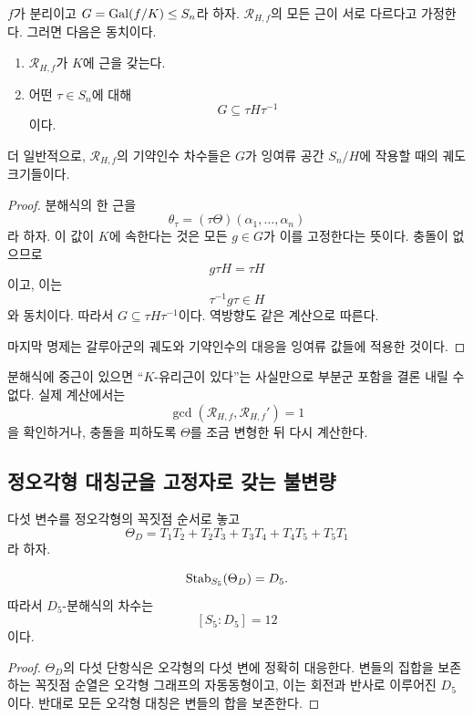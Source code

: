 \begin{theorem}[부분군 포함 판정]
\label{thm:subgroup-resolvent-criterion}
$f$가 분리이고 $G=\operatorname{Gal}(f/K)\le S_n$라 하자. $\mathcal R_{H,f}$의 모든 근이 서로 다르다고 가정한다. 그러면 다음은 동치이다.
\begin{enumerate}[label=(\roman*)]
  \item $\mathcal R_{H,f}$가 $K$에 근을 갖는다.
  \item 어떤 $\tau\in S_n$에 대해
  \[
    G\subseteq\tau H\tau^{-1}
  \]
  이다.
\end{enumerate}
더 일반적으로, $\mathcal R_{H,f}$의 기약인수 차수들은 $G$가 잉여류 공간 $S_n/H$에 작용할 때의 궤도 크기들이다.
\end{theorem}

\begin{proof}
분해식의 한 근을
\[
  \theta_\tau=(\tau\Theta)(\alpha_1,\dots,\alpha_n)
\]
라 하자. 이 값이 $K$에 속한다는 것은 모든 $g\in G$가 이를 고정한다는 뜻이다. 충돌이 없으므로
\[
  g\tau H=\tau H
\]
이고, 이는
\[
  \tau^{-1}g\tau\in H
\]
와 동치이다. 따라서 $G\subseteq\tau H\tau^{-1}$이다. 역방향도 같은 계산으로 따른다.

마지막 명제는 갈루아군의 궤도와 기약인수의 대응을 잉여류 값들에 적용한 것이다.
\end{proof}

\begin{pitfall}
분해식에 중근이 있으면 ``$K$-유리근이 있다''는 사실만으로 부분군 포함을 결론 내릴 수 없다. 실제 계산에서는
\[
  \gcd(\mathcal R_{H,f},\mathcal R_{H,f}')=1
\]
을 확인하거나, 충돌을 피하도록 $\Theta$를 조금 변형한 뒤 다시 계산한다.
\end{pitfall}

\subsection{정오각형 대칭군을 고정자로 갖는 불변량}

다섯 변수를 정오각형의 꼭짓점 순서로 놓고
\[
  \Theta_D
  =T_1T_2+T_2T_3+T_3T_4+T_4T_5+T_5T_1
\]
라 하자.

\begin{proposition}
\label{prop:d5-invariant-stabilizer}
\[
  \operatorname{Stab}_{S_5}(\Theta_D)=D_5.
\]
따라서 $D_5$-분해식의 차수는
\[
  [S_5:D_5]=12
\]
이다.
\end{proposition}

\begin{proof}
$\Theta_D$의 다섯 단항식은 오각형의 다섯 변에 정확히 대응한다. 변들의 집합을 보존하는 꼭짓점 순열은 오각형 그래프의 자동동형이고, 이는 회전과 반사로 이루어진 $D_5$이다. 반대로 모든 오각형 대칭은 변들의 합을 보존한다.
\end{proof}

